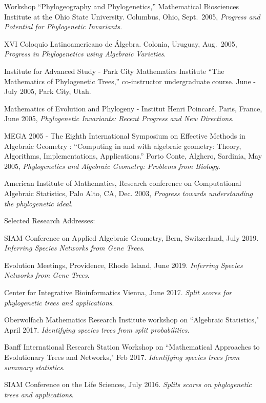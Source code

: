 \documentclass[10pt]{report}
\begin{document}
{Workshop ``Phylogeography and Phylogenetics,'' Mathematical
Biosciences Institute at the Ohio State University. Columbus, Ohio,
Sept.~2005, \emph{Progress and Potential for Phylogenetic
Invariants}.

XVI Coloquio Latinoamericano de \'Algebra.  Colonia, Uruguay,
Aug.~2005, \emph{Progress in Phylogenetics using Algebraic
Varieties}.

Institute for Advanced Study - Park City Mathematics Institute ``The
Mathematics of Phylogenetic Trees,'' co-instructor undergraduate
course. June - July 2005, Park City, Utah.

Mathematics of Evolution and Phylogeny - Institut Henri
Poincar\'e. Paris, France, June 2005, \emph{Phylogenetic
Invariants: Recent Progress and New Directions}.

MEGA 2005 - The Eighth International Symposium on Effective
Methods in Algebraic Geometry
: ``Computing in and with algebraic
geometry: Theory, Algorithms, Implementations, Applications.''
Porto Conte, Alghero, Sardinia, May 2005, \emph{Phylogenetics and
Algebraic Geometry: Problems from Biology}.

American Institute of Mathematics, Research conference on
Computational Algebraic Statistics, Palo Alto, CA, Dec. 2003, {\it
Progress towards understanding the phylogenetic ideal}.

\mbox{}

{\sc Selected Research Addresses:}

\smallskip

SIAM  Conference on Applied Algebraic Geometry, Bern, Switzerland,
July 2019.   \emph{Inferring Species Networks from Gene Trees}.

Evolution Meetings, Providence, Rhode Island, June 2019.
  \emph{Inferring Species Networks from Gene Trees}.

Center for Integrative Bioinformatics Vienna, June 2017.
\emph{Split scores for phylogenetic trees and applications}.

Oberwolfach Mathematics Research Institute workshop on
``Algebraic Statistics," April 2017.
\emph{Identifying species trees from split probabilities}.

Banff International Research Station Workshop on 
``Mathematical Approaches to Evolutionary Trees and Networks,"
Feb 2017. 
\emph{Identifying species trees from summary statistics}.

SIAM Conference on the Life Sciences, July 2016.
\emph{Splits scores on phylogenetic trees and applications}.

}
\end{document}
